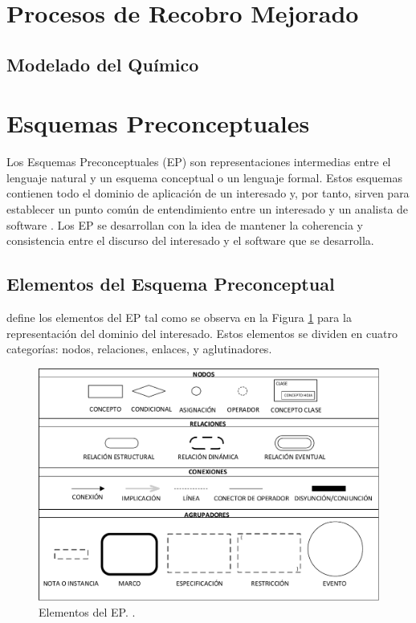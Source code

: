 \section{Procesos de Recobro Mejorado}

\subsection{Modelado del Químico}


\section{Esquemas Preconceptuales}

Los Esquemas Preconceptuales (EP) son representaciones intermedias entre el lenguaje natural y un esquema conceptual o un lenguaje formal. Estos esquemas contienen todo el dominio de aplicación de un interesado y, por tanto, sirven para establecer un punto común de entendimiento entre un interesado y un analista de software \citep{zapata2007phd}. Los EP se desarrollan con la idea de mantener la coherencia y consistencia entre el discurso del interesado y el software que se desarrolla. 

\subsection{Elementos del Esquema Preconceptual}
\cite{zapata2012unc} define los elementos del EP tal como se observa en la Figura \ref{fig:InitialPS} para la representación del dominio del interesado. Estos elementos se dividen en cuatro categorías: nodos, relaciones, enlaces, y aglutinadores.\\

\begin{figure}[h]
	\centering%
	\includegraphics[scale=0.51]{Fig/ElementosDelEP.pdf}%
	\caption[Elementos del EP.]{Elementos del EP. \citep{zapata2012unc}.} \label{fig:InitialPS}
\end{figure}

